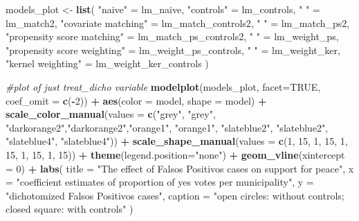 \documentclass[
]{article}
\newenvironment{Shaded}{\begin{snugshade}}{\end{snugshade}}
\newcommand{\AttributeTok}[1]{\textcolor[rgb]{0.13,0.29,0.53}{#1}}
\newcommand{\CommentTok}[1]{\textcolor[rgb]{0.56,0.35,0.01}{\textit{#1}}}
\newcommand{\ConstantTok}[1]{\textcolor[rgb]{0.56,0.35,0.01}{#1}}
\newcommand{\DecValTok}[1]{\textcolor[rgb]{0.00,0.00,0.81}{#1}}
\newcommand{\FunctionTok}[1]{\textcolor[rgb]{0.13,0.29,0.53}{\textbf{#1}}}
\newcommand{\NormalTok}[1]{#1}
\newcommand{\OtherTok}[1]{\textcolor[rgb]{0.56,0.35,0.01}{#1}}
\newcommand{\SpecialCharTok}[1]{\textcolor[rgb]{0.81,0.36,0.00}{\textbf{#1}}}
\newcommand{\StringTok}[1]{\textcolor[rgb]{0.31,0.60,0.02}{#1}}
\begin{document}
\begin{Shaded}
\begin{Highlighting}[]
\NormalTok{models\_plot }\OtherTok{\textless{}{-}} \FunctionTok{list}\NormalTok{(}
  \StringTok{"naive"} \OtherTok{=}\NormalTok{ lm\_naive,}
  \StringTok{"controls"} \OtherTok{=}\NormalTok{ lm\_controls,}
  \StringTok{" "} \OtherTok{=}\NormalTok{ lm\_match2,}
  \StringTok{"covariate matching"} \OtherTok{=}\NormalTok{ lm\_match\_controls2,}
  \StringTok{" "} \OtherTok{=}\NormalTok{ lm\_match\_ps2,}
  \StringTok{"propensity score matching"} \OtherTok{=}\NormalTok{ lm\_match\_ps\_controls2,}
  \StringTok{" "} \OtherTok{=}\NormalTok{ lm\_weight\_ps,}
  \StringTok{"propensity score weighting"} \OtherTok{=}\NormalTok{ lm\_weight\_ps\_controls,}
  \StringTok{" "} \OtherTok{=}\NormalTok{ lm\_weight\_ker,}
  \StringTok{"kernel weighting"} \OtherTok{=}\NormalTok{ lm\_weight\_ker\_controls}
\NormalTok{  )}

\CommentTok{\#plot of just treat\_dicho variable}
\FunctionTok{modelplot}\NormalTok{(models\_plot,}
          \AttributeTok{facet=}\ConstantTok{TRUE}\NormalTok{,}
          \AttributeTok{coef\_omit =} \FunctionTok{c}\NormalTok{(}\SpecialCharTok{{-}}\DecValTok{2}\NormalTok{)) }\SpecialCharTok{+}
  \FunctionTok{aes}\NormalTok{(}\AttributeTok{color =}\NormalTok{ model, }\AttributeTok{shape =}\NormalTok{ model) }\SpecialCharTok{+}
  \FunctionTok{scale\_color\_manual}\NormalTok{(}\AttributeTok{values =} \FunctionTok{c}\NormalTok{(}\StringTok{"grey"}\NormalTok{, }\StringTok{"grey"}\NormalTok{, }\StringTok{"darkorange2"}\NormalTok{,}\StringTok{"darkorange2"}\NormalTok{,}\StringTok{"orange1"}\NormalTok{, }\StringTok{"orange1"}\NormalTok{, }\StringTok{"slateblue2"}\NormalTok{, }\StringTok{"slateblue2"}\NormalTok{, }\StringTok{"slateblue4"}\NormalTok{, }\StringTok{"slateblue4"}\NormalTok{)) }\SpecialCharTok{+}
  \FunctionTok{scale\_shape\_manual}\NormalTok{(}\AttributeTok{values =} \FunctionTok{c}\NormalTok{(}\DecValTok{1}\NormalTok{, }\DecValTok{15}\NormalTok{, }\DecValTok{1}\NormalTok{, }\DecValTok{15}\NormalTok{, }\DecValTok{1}\NormalTok{, }\DecValTok{15}\NormalTok{, }\DecValTok{1}\NormalTok{, }\DecValTok{15}\NormalTok{, }\DecValTok{1}\NormalTok{, }\DecValTok{15}\NormalTok{)) }\SpecialCharTok{+}
  \FunctionTok{theme}\NormalTok{(}\AttributeTok{legend.position=}\StringTok{"none"}\NormalTok{) }\SpecialCharTok{+}
  \FunctionTok{geom\_vline}\NormalTok{(}\AttributeTok{xintercept =} \DecValTok{0}\NormalTok{) }\SpecialCharTok{+}
  \FunctionTok{labs}\NormalTok{(}
    \AttributeTok{title =} \StringTok{"The effect of Falsos Positivos cases on support for peace"}\NormalTok{,}
    \AttributeTok{x =} \StringTok{"coefficient estimates of proportion of yes votes per municipality"}\NormalTok{,}
    \AttributeTok{y =} \StringTok{"dichotomized Falsos Positivos cases"}\NormalTok{,}
    \AttributeTok{caption =} \StringTok{"open circles: without controls; closed square: with controls"}
\NormalTok{  )}
\end{Highlighting}
\end{Shaded}
\end{document}

